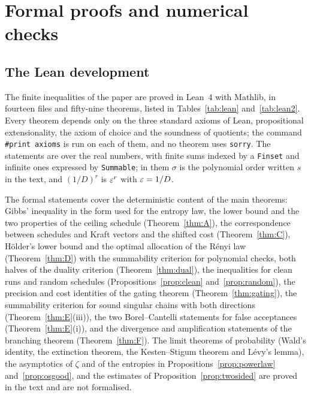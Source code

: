 \section{Formal proofs and numerical checks}\label{app:checks}

\subsection{The Lean development}

The finite inequalities of the paper are proved in Lean~4 with Mathlib, in fourteen files and fifty-nine theorems, listed in Tables~\ref{tab:lean} and~\ref{tab:lean2}. Every theorem depends only on the three standard axioms of Lean, propositional extensionality, the axiom of choice and the soundness of quotients; the command \texttt{\#print axioms} is run on each of them, and no theorem uses \texttt{sorry}. The statements are over the real numbers, with finite sums indexed by a \texttt{Finset} and infinite ones expressed by \texttt{Summable}; in them $\sigma$ is the polynomial order written $s$ in the text, and $(1/D)^{r}$ is $\varepsilon^{r}$ with $\varepsilon=1/D$.

The formal statements cover the deterministic content of the main theorems: Gibbs' inequality in the form used for the entropy law, the lower bound and the two properties of the ceiling schedule (Theorem~\ref{thm:A}), the correspondence between schedules and Kraft vectors and the shifted cost (Theorem~\ref{thm:C}), H\"older's lower bound and the optimal allocation of the R\'enyi law (Theorem~\ref{thm:D}) with the summability criterion for polynomial checks, both halves of the duality criterion (Theorem~\ref{thm:dual}), the inequalities for clean runs and random schedules (Propositions~\ref{prop:clean} and~\ref{prop:random}), the precision and cost identities of the gating theorem (Theorem~\ref{thm:gating}), the summability criterion for sound singular chains with both directions (Theorem~\ref{thm:E}(iii)), the two Borel--Cantelli statements for false acceptances (Theorem~\ref{thm:E}(i)), and the divergence and amplification statements of the branching theorem (Theorem~\ref{thm:F}). The limit theorems of probability (Wald's identity, the extinction theorem, the Kesten--Stigum theorem and L\'evy's lemma), the asymptotics of $\zeta$ and of the entropies in Propositions~\ref{prop:powerlaw} and~\ref{prop:osgood}, and the estimates of Proposition~\ref{prop:twosided} are proved in the text and are not formalised.

